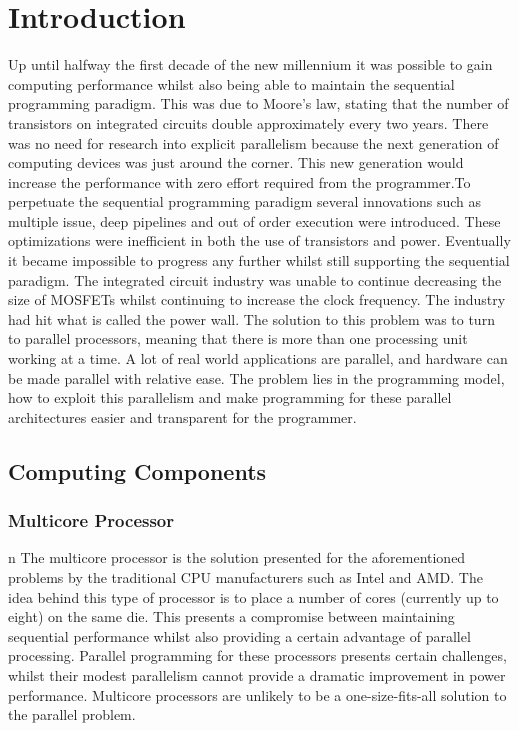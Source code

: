 



\chapter{Introduction} 
Up until halfway the first decade of the new millennium it was possible to gain computing performance whilst also being able to maintain the sequential programming paradigm. This was due to Moore's law, stating that the number of transistors on integrated circuits double approximately every two years. There was no need for research into explicit parallelism because the next generation of computing devices was just around the corner. This new generation would increase the performance with zero effort required from the programmer.To perpetuate the sequential programming paradigm several innovations such as multiple issue, deep pipelines and out of order execution were introduced. These optimizations  were inefficient in both the use of transistors and power. Eventually it became impossible to progress any further whilst still supporting the sequential paradigm. The integrated circuit industry was unable to continue decreasing the size of MOSFETs whilst continuing to increase the clock frequency. The industry had hit what is called the power wall.
The solution to this problem was to turn to parallel processors, meaning that there is more than one processing unit working at a time. A lot of real world applications are parallel, and hardware can be made parallel with relative ease. The problem lies in the programming model, how to exploit this parallelism and make programming for these parallel architectures easier and transparent for the programmer.



\section{Computing Components}

\subsection{Multicore Processor}n  
The multicore processor is the solution presented for the aforementioned problems by the traditional CPU manufacturers such as Intel and AMD. The idea behind this type of processor is to place a number of cores (currently up to eight) on the same die. This presents a compromise between maintaining sequential performance whilst also providing a certain advantage of parallel processing. Parallel programming for these processors presents certain challenges, whilst their modest parallelism cannot provide a dramatic improvement in power performance. Multicore processors are unlikely to be a one-size-fits-all solution to the parallel problem.\cite{asanovic_landscape_????}

